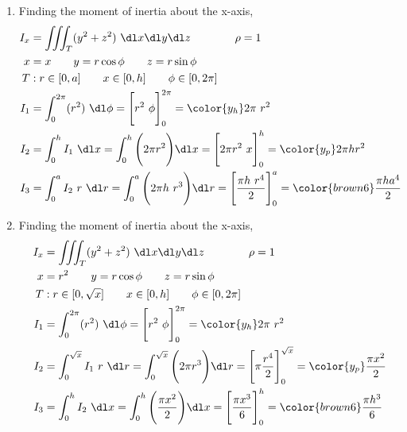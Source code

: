 \begin{enumerate}
     \item Finding the moment of inertia about the x-axis,
           \begin{align}
                I_x & = \iiint_T (y^2 + z^2)\ \dl x \dl y \dl z \qquad\qquad \rho = 1 \\
                x   & = x \qquad y = r \cos \phi \qquad z = r \sin \phi               \\
                T   & : r \in [0, a] \qquad x \in [0, h]
                \qquad \phi \in [0, 2\pi]                                             \\
                I_1 & = \int_{0}^{2\pi} (r^2) \ \dl \phi
                = \Bigg[ r^2\ \phi \Bigg]_{0}^{2\pi}
                = {\color{y_h} 2\pi\ r^2}                                             \\
                I_2 & = \int_{0}^{h} I_1 \ \dl x
                = \int_{0}^{h} \Bigg( 2\pi r^2 \Bigg) \dl x
                = \Bigg[ 2\pi r^2\ x \Bigg]_{0}^{h}
                = {\color{y_p} 2\pi h r^2 }                                           \\
                I_3 & = \int_{0}^{a} I_2\ r\ \dl r = \int_{0}^{a}
                \Bigg( 2\pi h\ r^3 \Bigg) \dl r
                = \Bigg[ \frac{\pi h\ r^4}{2} \Bigg]_{0}^{a}
                = {\color{brown6} \frac{\pi h a^4}{2}}
           \end{align}

     \item Finding the moment of inertia about the x-axis,
           \begin{align}
                I_x & = \iiint_T (y^2 + z^2)\ \dl x \dl y \dl z \qquad\qquad \rho = 1 \\
                x   & = r^2 \qquad y = r \cos \phi \qquad z = r \sin \phi             \\
                T   & : r \in [0, \sqrt{x}] \qquad x \in [0, h]
                \qquad \phi \in [0, 2\pi]                                             \\
                I_1 & = \int_{0}^{2\pi} (r^2) \ \dl \phi
                = \Bigg[ r^2\ \phi \Bigg]_{0}^{2\pi}
                = {\color{y_h} 2\pi\ r^2}                                             \\
                I_2 & = \int_{0}^{\sqrt{x}} I_1 \ r\ \dl r
                = \int_{0}^{\sqrt{x}} \Bigg( 2\pi r^3 \Bigg) \dl r
                = \Bigg[ \pi \frac{r^4}{2} \Bigg]_{0}^{\sqrt{x}}
                = {\color{y_p} \frac{\pi x^2}{2} }                                    \\
                I_3 & = \int_{0}^{h} I_2\ \dl x = \int_{0}^{h}
                \Bigg( \frac{\pi x^2}{2} \Bigg) \dl x
                = \Bigg[ \frac{\pi x^3}{6} \Bigg]_{0}^{h}
                = {\color{brown6} \frac{\pi h^3}{6}}
           \end{align}


\end{enumerate}
